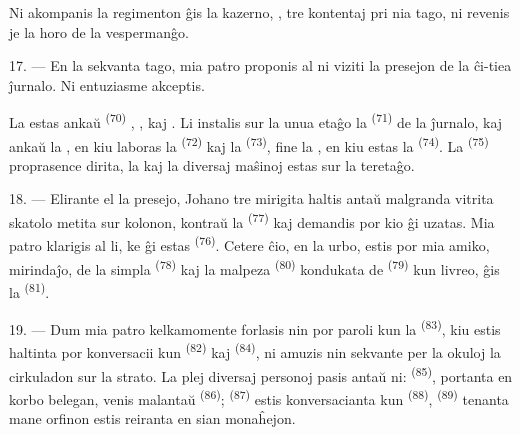 Ni akompanis la regimenton ĝis la kazerno, , tre kontentaj pri nia
tago, ni revenis je la horo de la vespermanĝo.

\VUsaut{3.0mm}

17. --- En la sekvanta tago, mia patro proponis al ni viziti la presejon de la
ĉi-tiea ĵurnalo. Ni entuziasme akceptis.

La  estas ankaŭ  \textsuperscript{(70)}
, ,  kaj
. Li instalis sur la unua etaĝo la 
\textsuperscript{(71)} de la ĵurnalo, kaj ankaŭ la , en kiu
laboras la  \textsuperscript{(72)} kaj la
 \textsuperscript{(73)}, fine la
, en kiu estas la 
\textsuperscript{(74)}. La  \textsuperscript{(75)}
proprasence dirita, la  kaj la diversaj maŝinoj estas sur
la teretaĝo.

\VUsaut{3.0mm}

18. --- Elirante el la presejo, Johano tre mirigita haltis antaŭ malgranda
vitrita skatolo metita sur kolonon, kontraŭ la 
\textsuperscript{(77)} kaj demandis por kio ĝi uzatas. Mia patro klarigis al li,
ke ĝi estas  \textsuperscript{(76)}. Cetere ĉio, en la
urbo, estis por mia amiko, mirindaĵo, de la simpla 
\textsuperscript{(78)} kaj la malpeza 
\textsuperscript{(80)} kondukata de  \textsuperscript{(79)} kun
livreo, ĝis la  \textsuperscript{(81)}.

19. --- Dum mia patro kelkamomente forlasis nin por paroli kun la
 \textsuperscript{(83)}, kiu estis haltinta por
konversacii kun  \textsuperscript{(82)} kaj 
\textsuperscript{(84)}, ni amuzis nin sekvante per la okuloj la cirkuladon sur
la strato. La plej diversaj personoj pasis antaŭ ni:  \textsuperscript{(85)}, portanta en korbo 
belegan, venis malantaŭ  \textsuperscript{(86)};
 \textsuperscript{(87)} estis konversacianta kun
 \textsuperscript{(88)}, 
\textsuperscript{(89)} tenanta mane orfinon estis reiranta en sian monaĥejon.


